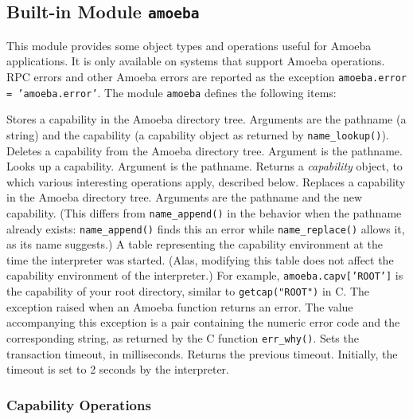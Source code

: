 \subsection{Built-in Module {\tt amoeba}}

This module provides some object types and operations useful for
Amoeba applications.
It is only available on systems that support Amoeba operations.
RPC errors and other Amoeba errors are reported as the exception
{\tt amoeba.error = 'amoeba.error'}.
The module
{\tt amoeba}
defines the following items:
\begin{description}
Stores a capability in the Amoeba directory tree.
Arguments are the pathname (a string) and the capability (a capability
object as returned by
{\tt name\_lookup()}).
Deletes a capability from the Amoeba directory tree.
Argument is the pathname.
Looks up a capability.
Argument is the pathname.
Returns a
{\em capability}
object, to which various interesting operations apply, described below.
Replaces a capability in the Amoeba directory tree.
Arguments are the pathname and the new capability.
(This differs from
{\tt name\_append()}
in the behavior when the pathname already exists:
{\tt name\_append()}
finds this an error while
{\tt name\_replace()}
allows it, as its name suggests.)
A table representing the capability environment at the time the
interpreter was started.
(Alas, modifying this table does not affect the capability environment
of the interpreter.)
For example,
{\tt amoeba.capv['ROOT']}
is the capability of your root directory, similar to
{\tt getcap("ROOT")}
in C.
The exception raised when an Amoeba function returns an error.
The value accompanying this exception is a pair containing the numeric
error code and the corresponding string, as returned by the C function
{\tt err\_why()}.
Sets the transaction timeout, in milliseconds.
Returns the previous timeout.
Initially, the timeout is set to 2 seconds by the {\Python} interpreter.
\end{description}

\subsubsection{Capability Operations}

